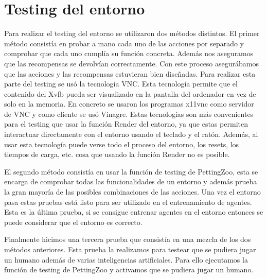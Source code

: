\chapter{Testing del entorno}

Para realizar el testing del entorno se utilizaron dos métodos distintos. El primer método consistía en probar a mano cada uno de las acciones por separado y comprobar que cada uno cumplía su función concreta. Además nos aseguramos que las recompensas se devolvían correctamente. Con este proceso asegurábamos que las acciones y las recompensas estuvieran bien diseñadas. Para realizar esta parte del testing se usó la tecnología VNC. Esta tecnología permite que el contenido del Xvfb pueda ser visualizado en la pantalla del ordenador en vez de solo en la memoria. En concreto se usaron los programas x11vnc como servidor de VNC y como cliente se usó Vinagre. Estas tecnologías son más convenientes para el testing que usar la función Render del entorno, ya que estas permiten interactuar directamente con el entorno usando el teclado y el ratón. Además, al usar esta tecnología puede verse todo el proceso del entorno, los resets, los tiempos de carga, etc. cosa que usando la función Render no es  posible.

El segundo método consistía en usar la función de testing de PettingZoo, esta se encarga de comprobar todas las funcionalidades de un entorno y además prueba la gran mayoría de las posibles combinaciones de las acciones. Una vez el entorno pasa estas pruebas está listo para ser utilizado en el entrenamiento de agentes. Esta es la última prueba, si se consigue entrenar agentes en el entorno entonces se puede considerar que el entorno es correcto.

Finalmente hicimos una tercera prueba que consistía en una mezcla de los dos métodos anteriores. Esta prueba la realizamos para testear que se pudiera jugar un humano además de varias inteligencias artificiales. Para ello ejecutamos la función de testing de PettingZoo y activamos que se pudiera jugar un humano.

